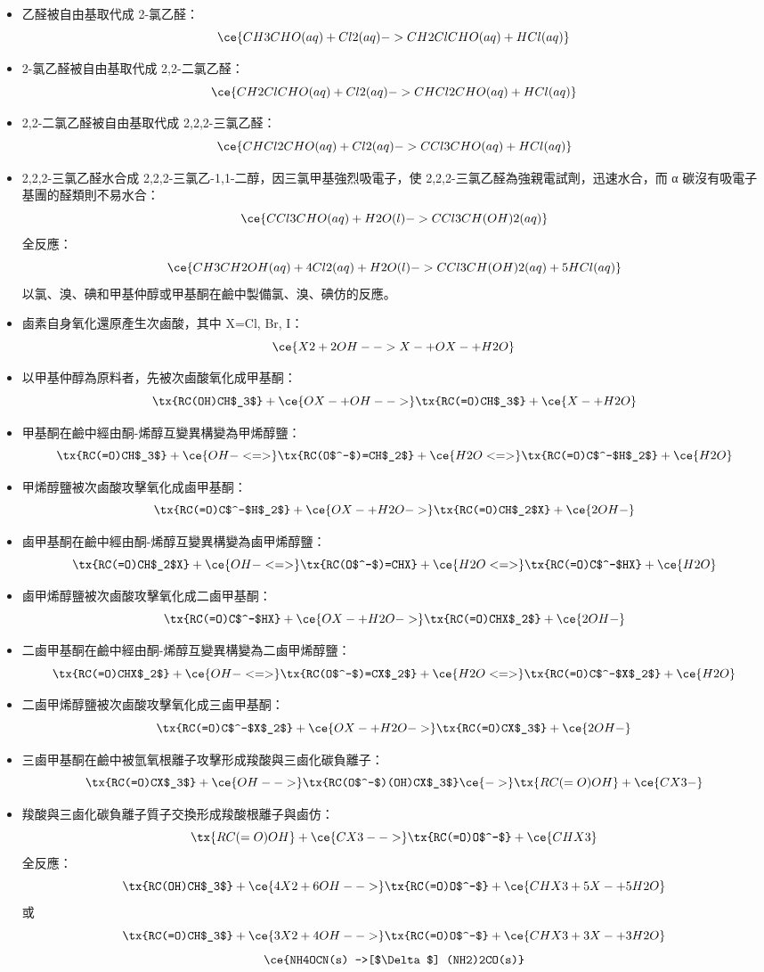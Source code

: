 \documentclass[a4paper,12pt]{report}
\begin{document}
\begin{itemize}
\item 乙醛被自由基取代成 2-氯乙醛：
\[\ce{CH3CHO(aq) + Cl2(aq) -> CH2ClCHO(aq) + HCl(aq)}\]
\item 2-氯乙醛被自由基取代成 2,2-二氯乙醛：
\[\ce{CH2ClCHO(aq) + Cl2(aq) -> CHCl2CHO(aq) + HCl(aq)}\]
\item 2,2-二氯乙醛被自由基取代成 2,2,2-三氯乙醛：
\[\ce{CHCl2CHO(aq) + Cl2(aq) -> CCl3CHO(aq) + HCl(aq)}\]
\item 2,2,2-三氯乙醛水合成 2,2,2-三氯乙-1,1-二醇，因三氯甲基強烈吸電子，使 2,2,2-三氯乙醛為強親電試劑，迅速水合，而 α 碳沒有吸電子基團的醛類則不易水合：
\[\ce{CCl3CHO(aq) + H2O(l) -> CCl3CH(OH)2(aq)}\]
\een
全反應：
\[\ce{CH3CH2OH(aq) + 4Cl2(aq) + H2O(l) -> CCl3CH(OH)2(aq) + 5HCl(aq)}\]
以氯、溴、碘和甲基仲醇或甲基酮在鹼中製備氯、溴、碘仿的反應。
\ben
\item 鹵素自身氧化還原產生次鹵酸，其中 X=Cl, Br, I：
\[\ce{X2 + 2OH- -> X- + OX- + H2O}\]
\item 以甲基仲醇為原料者，先被次鹵酸氧化成甲基酮：
\[\tx{RC(OH)CH$_3$} + \ce{OX- + OH- ->} \tx{RC(=O)CH$_3$} + \ce{X- + H2O}\]
\item 甲基酮在鹼中經由酮-烯醇互變異構變為甲烯醇鹽：
\[\tx{RC(=O)CH$_3$} + \ce{OH- <=>} \tx{RC(O$^-$)=CH$_2$} + \ce{H2O <=>} \tx{RC(=O)C$^-$H$_2$} + \ce{H2O}\]
\item 甲烯醇鹽被次鹵酸攻擊氧化成鹵甲基酮：
\[\tx{RC(=O)C$^-$H$_2$} + \ce{OX- + H2O ->} \tx{RC(=O)CH$_2$X} + \ce{2OH-}\]
\item 鹵甲基酮在鹼中經由酮-烯醇互變異構變為鹵甲烯醇鹽：
\[\tx{RC(=O)CH$_2$X} + \ce{OH- <=>} \tx{RC(O$^-$)=CHX} + \ce{H2O <=>} \tx{RC(=O)C$^-$HX} + \ce{H2O}\]
\item 鹵甲烯醇鹽被次鹵酸攻擊氧化成二鹵甲基酮：
\[\tx{RC(=O)C$^-$HX} + \ce{OX- + H2O ->} \tx{RC(=O)CHX$_2$} + \ce{2OH-}\]
\item 二鹵甲基酮在鹼中經由酮-烯醇互變異構變為二鹵甲烯醇鹽：
\[\tx{RC(=O)CHX$_2$} + \ce{OH- <=>} \tx{RC(O$^-$)=CX$_2$} + \ce{H2O <=>} \tx{RC(=O)C$^-$X$_2$} + \ce{H2O}\]
\item 二鹵甲烯醇鹽被次鹵酸攻擊氧化成三鹵甲基酮：
\[\tx{RC(=O)C$^-$X$_2$} + \ce{OX- + H2O ->} \tx{RC(=O)CX$_3$} + \ce{2OH-}\]
\item 三鹵甲基酮在鹼中被氫氧根離子攻擊形成羧酸與三鹵化碳負離子：
\[\tx{RC(=O)CX$_3$} + \ce{OH- ->} \tx{RC(O$^-$)(OH)CX$_3$} \ce{->} \tx{RC(=O)OH} + \ce{CX3-}\]
\item 羧酸與三鹵化碳負離子質子交換形成羧酸根離子與鹵仿：
\[\tx{RC(=O)OH} + \ce{CX3- ->} \tx{RC(=O)O$^-$} + \ce{CHX3}\]
\een
全反應：
\[\tx{RC(OH)CH$_3$} + \ce{4X2 + 6OH- ->} \tx{RC(=O)O$^-$} + \ce{CHX3 + 5X- + 5H2O}\]
或
\[\tx{RC(=O)CH$_3$} + \ce{3X2 + 4OH- ->} \tx{RC(=O)O$^-$} + \ce{CHX3 + 3X- + 3H2O}\]
\[\ce{NH4OCN(s) ->[$\Delta$] (NH2)2CO(s)}\]



\end{itemize}
\end{document}
